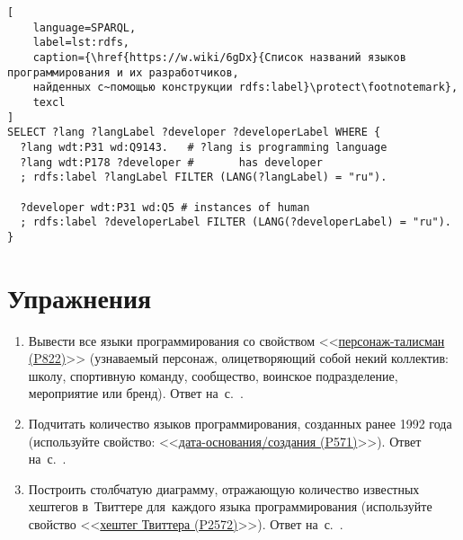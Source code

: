 \begin{lstlisting}[
	language=SPARQL,
	label=lst:rdfs,
	caption={\href{https://w.wiki/6gDx}{Список названий языков программирования и их разработчиков, 
    найденных с~помощью конструкции rdfs:label}\protect\footnotemark},
	texcl
]
SELECT ?lang ?langLabel ?developer ?developerLabel WHERE {
  ?lang wdt:P31 wd:Q9143.   # ?lang is programming language
  ?lang wdt:P178 ?developer #       has developer
  ; rdfs:label ?langLabel FILTER (LANG(?langLabel) = "ru").
  
  ?developer wdt:P31 wd:Q5 # instances of human
  ; rdfs:label ?developerLabel FILTER (LANG(?developerLabel) = "ru").
}
\end{lstlisting}





\section{Упражнения}
\label{prog_lang_test}
\begin{enumerate}
	\item Вывести все языки программирования со свойством <<\href{https://www.wikidata.org/wiki/Property:P822}{персонаж-талисман (P822)}>> (узнаваемый персонаж, олицетворяющий собой некий коллектив: школу, спортивную команду, сообщество, воинское подразделение, мероприятие или бренд).
Ответ на~с.~\pageref{answer:prog_langs_4}.

	\item Подчитать количество языков программирования, созданных ранее 1992 года (используйте свойство: <<\href{https://www.wikidata.org/wiki/Property:P571}{дата-основания/создания (P571)}>>).
Ответ на~с.~\pageref{answer:prog_langs_4}.

	\item Построить столбчатую диаграмму, отражающую количество известных хештегов в~Твиттере 
        для~каждого языка программирования 
        (используйте свойство <<\href{https://www.wikidata.org/wiki/Property:P2572}{хештег Твиттера (P2572)}>>).
        Ответ на~с.~\pageref{answer:prog_langs_4}.
\end{enumerate}
